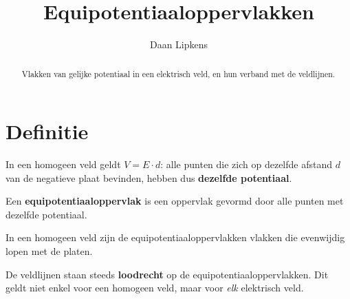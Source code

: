 \documentclass{ximera}
\title{Equipotentiaaloppervlakken}
\author{Daan Lipkens}
\begin{document}
\begin{abstract}
    Vlakken van gelijke potentiaal in een elektrisch veld, en hun verband met de veldlijnen.
\end{abstract}
\maketitle

\section{Definitie}
In een homogeen veld geldt $V = E \cdot d$: alle punten die zich op dezelfde afstand $d$ van de negatieve plaat bevinden, hebben dus \textbf{dezelfde potentiaal}.

\begin{definition}[title={Equipotentiaaloppervlak}]\nl
Een \textbf{equipotentiaaloppervlak} is een oppervlak gevormd door alle punten met dezelfde potentiaal.
\end{definition}

In een homogeen veld zijn de equipotentiaaloppervlakken vlakken die evenwijdig lopen met de platen.

\begin{center}
\end{center}

\begin{remark}[title={Belangrijke eigenschap}]\nl
De veldlijnen staan steeds \textbf{loodrecht} op de equipotentiaaloppervlakken. Dit geldt niet enkel voor een homogeen veld, maar voor \emph{elk} elektrisch veld.
\end{remark}
\end{document}
